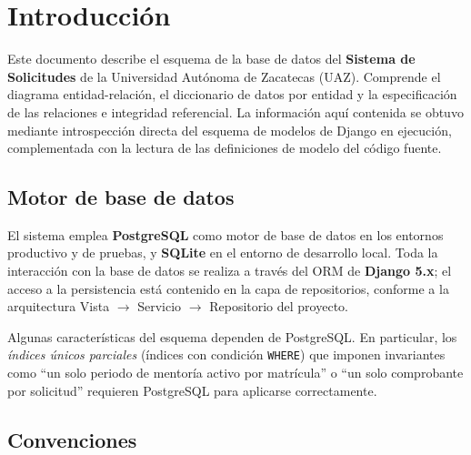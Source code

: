 \documentclass[12pt,letterpaper]{report}
\begin{document}
\tableofcontents\newpage

\chapter{Introducción}

Este documento describe el esquema de la base de datos del \textbf{Sistema de
Solicitudes} de la Universidad Autónoma de Zacatecas (UAZ). Comprende el
diagrama entidad-relación, el diccionario de datos por entidad y la
especificación de las relaciones e integridad referencial. La información aquí
contenida se obtuvo mediante introspección directa del esquema de modelos de
Django en ejecución, complementada con la lectura de las definiciones de modelo
del código fuente.

\section{Motor de base de datos}

El sistema emplea \textbf{PostgreSQL} como motor de base de datos en los
entornos productivo y de pruebas, y \textbf{SQLite} en el entorno de desarrollo
local. Toda la interacción con la base de datos se realiza a través del ORM de
\textbf{Django 5.x}; el acceso a la persistencia está contenido en la capa de
repositorios, conforme a la arquitectura Vista $\rightarrow$ Servicio
$\rightarrow$ Repositorio del proyecto.

Algunas características del esquema dependen de PostgreSQL. En particular, los
\emph{índices únicos parciales} (índices con condición \texttt{WHERE}) que
imponen invariantes como ``un solo periodo de mentoría activo por matrícula'' o
``un solo comprobante por solicitud'' requieren PostgreSQL para aplicarse
correctamente.

\section{Convenciones}
\end{document}
